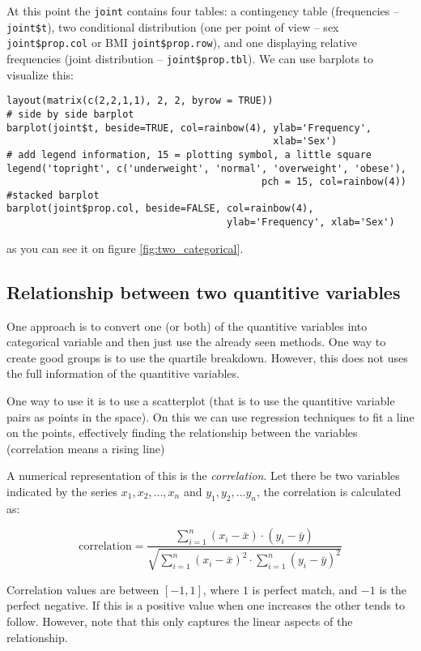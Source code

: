 At this point the \texttt{joint} contains four tables: a contingency table
(frequencies -- \texttt{joint\$t}), two conditional distribution (one per point
of view -- sex \texttt{joint\$prop.col} or BMI \texttt{joint\$prop.row}), and
one displaying relative frequencies (joint distribution --
\texttt{joint\$prop.tbl}). We can use barplots to visualize this:

\begin{verbatim}
layout(matrix(c(2,2,1,1), 2, 2, byrow = TRUE))
# side by side barplot
barplot(joint$t, beside=TRUE, col=rainbow(4), ylab='Frequency', 
                                              xlab='Sex')
# add legend information, 15 = plotting symbol, a little square
legend('topright', c('underweight', 'normal', 'overweight', 'obese'), 
                                            pch = 15, col=rainbow(4))
#stacked barplot
barplot(joint$prop.col, beside=FALSE, col=rainbow(4), 
                                      ylab='Frequency', xlab='Sex')
\end{verbatim}

as you can see it on figure \ref{fig:two_categorical}.

\subsection{Relationship between two quantitive variables}

One approach is to convert one (or both) of the quantitive variables into
categorical variable and then just use the already seen methods. One way to
create good groups is to use the quartile breakdown. However, this does not uses
the full information of the quantitive variables. 

One way to use it is to use a scatterplot (that is to use the quantitive
variable pairs as points in the space). On this we can use regression techniques
to fit a line on the points, effectively finding the relationship between the
variables (correlation means a rising line)

A numerical representation of this is the \emph{correlation}. Let there be two
variables indicated by the series $x_1, x_2, \ldots, x_n$ and $y_1, y_2, \ldots
y_n$, the correlation is calculated as:

\[ \mbox{correlation} = \frac{\sum_{i=1}^{n}\left( x_i-\bar{x}\right) \cdot
\left( y_i - \bar{y}\right)}{\sqrt{\sum_{i=1}^{n}\left( x_i-\bar{x}\right)^2
\cdot \sum_{i=1}^{n}\left( y_i - \bar{y}\right)^2}}
\]

Correlation values are between $[-1, 1]$, where $1$ is perfect match, and $-1$
is the perfect negative. If this is a positive value when one increases the
other tends to follow. However, note that this only captures the linear aspects
of the relationship.


